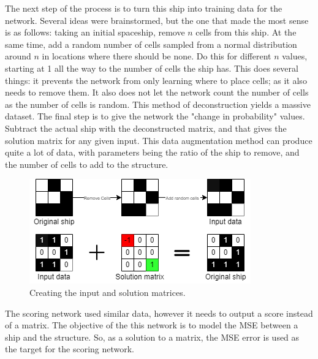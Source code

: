 \documentclass{l4proj}
\begin{document}
The next step of the process is to turn this ship into training data for the network. Several ideas were brainstormed, but the one that made the most sense is as follows: taking an initial spaceship, remove $n$ cells from this ship. At the same time, add a random number of cells sampled from a normal distribution around $n$ in locations where there should be none. Do this for different $n$ values, starting at 1 all the way to the number of cells the ship has. This does several things: it prevents the network from only learning where to place cells; as it also needs to remove them. It also does not let the network count the number of cells as the number of cells is random. This method of deconstruction yields a massive dataset. The final step is to give the network the "change in probability" values. Subtract the actual ship with the deconstructed matrix, and that gives the solution matrix for any given input. This data augmentation method can produce quite a lot of data, with parameters being the ratio of the ship to remove, and the number of cells to add to the structure.

\begin{figure}[h]
\centering
\includegraphics[width=\textwidth]{dissertation/images/diagrams/data_augmentation.png} 
\caption{Creating the input and solution matrices.}
\label{fig:subim1}
\end{figure}

The scoring network used similar data, however it needs to output a score instead of a matrix. The objective of the this network is to model the MSE between a ship and the structure. So, as a solution to a matrix, the MSE error is used as the target for the scoring network. 

\end{document}

